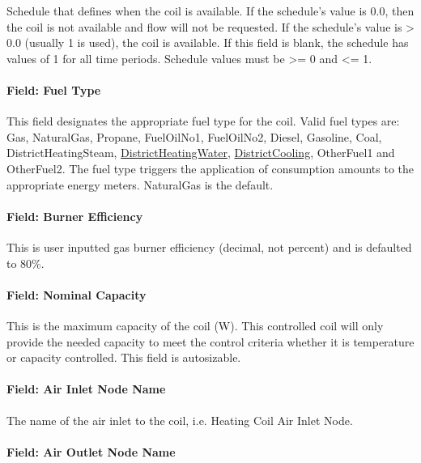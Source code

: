 Schedule that defines when the coil is available. If the schedule's value is 0.0, then the coil is not available and flow will not be requested. If the schedule's value is \textgreater{} 0.0 (usually 1 is used), the coil is available. If this field is blank, the schedule has values of 1 for all time periods. Schedule values must be \textgreater{}= 0 and \textless{}= 1.

\paragraph{Field: Fuel Type}

This field designates the appropriate fuel type for the coil. Valid fuel types are: Gas, NaturalGas, Propane, FuelOilNo1, FuelOilNo2, Diesel, Gasoline, Coal, DistrictHeatingSteam, \hyperref[districtheating]{DistrictHeatingWater}, \hyperref[districtcooling]{DistrictCooling}, OtherFuel1 and OtherFuel2. The fuel type triggers the application of consumption amounts to the appropriate energy meters. NaturalGas is the default.

\paragraph{Field: Burner Efficiency}\label{field-gas-burner-efficiency}

This is user inputted gas burner efficiency (decimal, not percent) and is defaulted to 80\%.

\paragraph{Field: Nominal Capacity}\label{field-nominal-capacity-1-000}

This is the maximum capacity of the coil (W). This controlled coil will only provide the needed capacity to meet the control criteria whether it is temperature or capacity controlled. This field is autosizable.

\paragraph{Field: Air Inlet Node Name}\label{field-air-inlet-node-name-6}

The name of the air inlet to the coil, i.e. Heating Coil Air Inlet Node.

\paragraph{Field: Air Outlet Node Name}\label{field-air-outlet-node-name-6-000}

